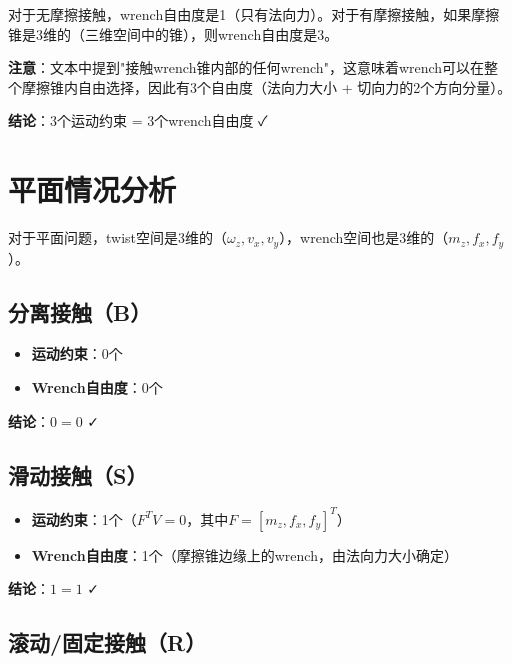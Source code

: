 \documentclass[12pt,a4paper]{article}
\begin{document}
对于无摩擦接触，wrench自由度是1（只有法向力）。对于有摩擦接触，如果摩擦锥是3维的（三维空间中的锥），则wrench自由度是3。

\textbf{注意}：文本中提到"接触wrench锥内部的任何wrench"，这意味着wrench可以在整个摩擦锥内自由选择，因此有3个自由度（法向力大小 + 切向力的2个方向分量）。

\textbf{结论}：$3$个运动约束 = $3$个wrench自由度 ✓

\section{平面情况分析}

对于平面问题，twist空间是3维的（$\omega_z, v_x, v_y$），wrench空间也是3维的（$m_z, f_x, f_y$）。

\subsection{分离接触（B）}

\begin{itemize}
    \item \textbf{运动约束}：0个
    \item \textbf{Wrench自由度}：0个
\end{itemize}

\textbf{结论}：$0 = 0$ ✓

\subsection{滑动接触（S）}

\begin{itemize}
    \item \textbf{运动约束}：1个（$F^T V = 0$，其中$F = [m_z, f_x, f_y]^T$）
    \item \textbf{Wrench自由度}：1个（摩擦锥边缘上的wrench，由法向力大小确定）
\end{itemize}

\textbf{结论}：$1 = 1$ ✓

\subsection{滚动/固定接触（R）}
\end{document}

